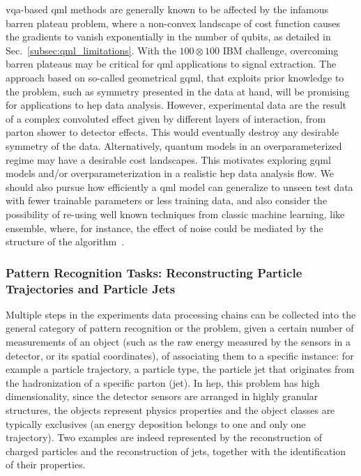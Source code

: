 \gls{vqa}-based \gls{qml} methods are generally known to be affected by the infamous barren plateau problem, where a non-convex landscape of cost function causes the gradients to vanish exponentially in the number of qubits,
as detailed in Sec.~\ref{subsec:qml_limitations}. 
With the $100 \otimes 100$ IBM challenge, overcoming barren plateaus may be critical for \gls{qml} applications to signal extraction. The approach based on so-called geometrical \gls{gqml}, that exploits prior knowledge to the problem, such as symmetry presented in the data at hand, will be promising for applications to \gls{hep} data analysis. However, experimental data are the result of a complex convoluted effect given by different layers of interaction, from parton shower to detector effects. This would eventually destroy any desirable symmetry of the data. Alternatively, quantum models in an overparameterized regime may have a desirable cost landscapes. This motivates exploring \gls{gqml} models and/or overparameterization in a realistic \gls{hep} data analysis flow. We should also pursue how efficiently a \gls{qml} model can generalize to unseen test data with fewer trainable parameters or less training data, and also consider the possibility of re-using well known techniques from classic machine learning, like ensemble, where, for instance, the effect of noise could be mediated by the structure of the algorithm~\cite{incudini2023resource}.


\subsubsection{Pattern Recognition Tasks: Reconstructing Particle Trajectories and Particle Jets}
Multiple steps in the experiments data processing chains can be collected into the general category of pattern recognition or the problem, given a certain number of measurements of an object (such as the raw energy measured by the sensors in a detector, or its spatial coordinates), of associating them to a specific instance: for example a particle trajectory, a particle type, the particle jet that originates from the hadronization of a specific parton (jet).   
In \gls{hep}, this problem has high dimensionality, since the detector sensors are arranged in highly granular structures, the objects represent physics properties and the object classes are typically exclusives (an energy deposition belongs to one and only one trajectory). 
Two examples are indeed represented by the reconstruction of charged particles and the reconstruction of jets, together with the identification of their properties.

